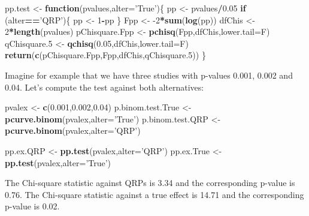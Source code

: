 \documentclass[]{book}
\newenvironment{Shaded}{\begin{snugshade}}{\end{snugshade}}
\newcommand{\ControlFlowTok}[1]{\textcolor[rgb]{0.13,0.29,0.53}{\textbf{#1}}}
\newcommand{\DataTypeTok}[1]{\textcolor[rgb]{0.13,0.29,0.53}{#1}}
\newcommand{\DecValTok}[1]{\textcolor[rgb]{0.00,0.00,0.81}{#1}}
\newcommand{\FloatTok}[1]{\textcolor[rgb]{0.00,0.00,0.81}{#1}}
\newcommand{\KeywordTok}[1]{\textcolor[rgb]{0.13,0.29,0.53}{\textbf{#1}}}
\newcommand{\NormalTok}[1]{#1}
\newcommand{\OperatorTok}[1]{\textcolor[rgb]{0.81,0.36,0.00}{\textbf{#1}}}
\newcommand{\StringTok}[1]{\textcolor[rgb]{0.31,0.60,0.02}{#1}}
\theoremstyle{definition}
\theoremstyle{definition}
\theoremstyle{definition}
\theoremstyle{remark}
\begin{document}
\begin{Shaded}
\begin{Highlighting}[]
\NormalTok{pp.test <-}\StringTok{ }\ControlFlowTok{function}\NormalTok{(pvalues,}\DataTypeTok{alter=}\StringTok{'True'}\NormalTok{)\{}
\NormalTok{  pp <-}\StringTok{ }\NormalTok{pvalues}\OperatorTok{/}\FloatTok{0.05}
  \ControlFlowTok{if}\NormalTok{ (alter}\OperatorTok{==}\StringTok{'QRP'}\NormalTok{)\{}
\NormalTok{    pp <-}\StringTok{ }\DecValTok{1}\OperatorTok{-}\NormalTok{pp}
\NormalTok{  \}}
\NormalTok{  Fpp <-}\StringTok{ }\DecValTok{-2}\OperatorTok{*}\KeywordTok{sum}\NormalTok{(}\KeywordTok{log}\NormalTok{(pp))}
\NormalTok{  dfChis <-}\StringTok{ }\DecValTok{2}\OperatorTok{*}\KeywordTok{length}\NormalTok{(pvalues)}
\NormalTok{  pChisquare.Fpp <-}\StringTok{ }\KeywordTok{pchisq}\NormalTok{(Fpp,dfChis,}\DataTypeTok{lower.tail=}\NormalTok{F)}
\NormalTok{  qChisquare}\FloatTok{.5}\NormalTok{ <-}\StringTok{ }\KeywordTok{qchisq}\NormalTok{(}\FloatTok{0.05}\NormalTok{,dfChis,}\DataTypeTok{lower.tail=}\NormalTok{F)}
  \KeywordTok{return}\NormalTok{(}\KeywordTok{c}\NormalTok{(pChisquare.Fpp,Fpp,dfChis,qChisquare}\FloatTok{.5}\NormalTok{))}
\NormalTok{\}}
\end{Highlighting}
\end{Shaded}

Imagine for example that we have three studies with p-values 0.001, 0.002 and 0.04.
Let's compute the test against both alternatives:

\begin{Shaded}
\begin{Highlighting}[]
\NormalTok{pvalex <-}\StringTok{ }\KeywordTok{c}\NormalTok{(}\FloatTok{0.001}\NormalTok{,}\FloatTok{0.002}\NormalTok{,}\FloatTok{0.04}\NormalTok{)}
\NormalTok{p.binom.test.True <-}\StringTok{ }\KeywordTok{pcurve.binom}\NormalTok{(pvalex,}\DataTypeTok{alter=}\StringTok{'True'}\NormalTok{)}
\NormalTok{p.binom.test.QRP <-}\StringTok{ }\KeywordTok{pcurve.binom}\NormalTok{(pvalex,}\DataTypeTok{alter=}\StringTok{'QRP'}\NormalTok{)}

\NormalTok{pp.ex.QRP <-}\StringTok{ }\KeywordTok{pp.test}\NormalTok{(pvalex,}\DataTypeTok{alter=}\StringTok{'QRP'}\NormalTok{)}
\NormalTok{pp.ex.True <-}\StringTok{ }\KeywordTok{pp.test}\NormalTok{(pvalex,}\DataTypeTok{alter=}\StringTok{'True'}\NormalTok{)}
\end{Highlighting}
\end{Shaded}

The Chi-square statistic against QRPs is 3.34 and the corresponding p-value is 0.76.
The Chi-square statistic against a true effect is 14.71 and the corresponding p-value is 0.02.
\end{document}
